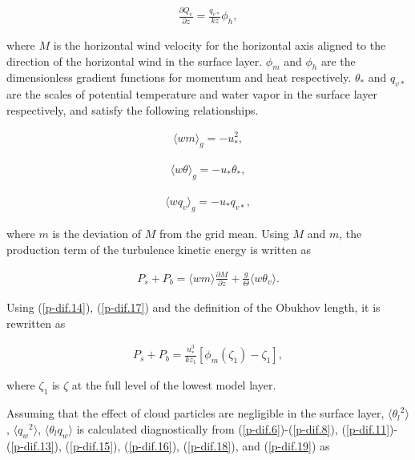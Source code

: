 \begin{eqnarray} \frac{\partial Q_v}{\partial z} = \frac{q_{v*}}{kz}\phi_h \label{p-dif.16},\end{eqnarray}

where \(M\) is the horizontal wind velocity for the horizontal axis aligned to the direction of the horizontal wind in the surface layer. \(\phi_m\) and \(\phi_h\) are the dimensionless gradient
functions for momentum and heat respectively. \(\theta_*\) and \(q_{v*}\) are the scales of potential temperature and water vapor in the surface layer respectively, and satisfy the following
relationships.

\begin{eqnarray} \langle wm \rangle_g = -u_*^2 \label{p-dif.17},\end{eqnarray}

\begin{eqnarray} \langle w\theta \rangle_g = -u_*\theta_* \label{p-dif.18},\end{eqnarray}

\begin{eqnarray} \langle wq_v \rangle_g = -u_*q_{v*} \label{p-dif.19},\end{eqnarray}

where \(m\) is the deviation of \(M\) from the grid mean. Using \(M\) and \(m\), the production term of the turbulence kinetic energy is written as

\begin{eqnarray} P_s + P_b = \langle wm \rangle \frac{\partial M}{\partial z} + \frac{g}{\Theta} \langle w\theta_v \rangle. \end{eqnarray}

Using (\ref{p-dif.14}), (\ref{p-dif.17}) and the definition of the Obukhov length, it is rewritten as

\begin{eqnarray} P_s + P_b = \frac{u_*^3}{kz_1}\left[\phi_m\left(\zeta_1\right)-\zeta_1\right], \end{eqnarray}

where \(\zeta_1\) is \(\zeta\) at the full level of the lowest model layer.

Assuming that the effect of cloud particles are negligible in the surface layer, \(\langle {\theta_l}^2\rangle\), \(\langle {q_w}^2\rangle\), \(\langle \theta_lq_w\rangle\) is calculated
diagnostically from (\ref{p-dif.6})-(\ref{p-dif.8}), (\ref{p-dif.11})-(\ref{p-dif.13}), (\ref{p-dif.15}), (\ref{p-dif.16}), (\ref{p-dif.18}), and (\ref{p-dif.19})
as

